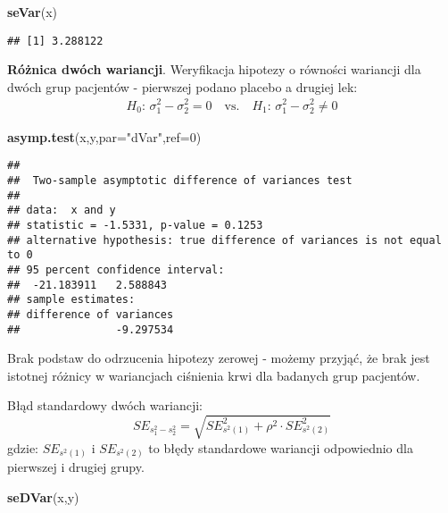 \documentclass[polish,]{book}
\newenvironment{Shaded}{\begin{snugshade}}{\end{snugshade}}
\newcommand{\DataTypeTok}[1]{\textcolor[rgb]{0.13,0.29,0.53}{#1}}
\newcommand{\DecValTok}[1]{\textcolor[rgb]{0.00,0.00,0.81}{#1}}
\newcommand{\KeywordTok}[1]{\textcolor[rgb]{0.13,0.29,0.53}{\textbf{#1}}}
\newcommand{\NormalTok}[1]{#1}
\newcommand{\StringTok}[1]{\textcolor[rgb]{0.31,0.60,0.02}{#1}}
\begin{document}
\begin{Shaded}
\begin{Highlighting}[]
\KeywordTok{seVar}\NormalTok{(x)}
\end{Highlighting}
\end{Shaded}

\begin{verbatim}
## [1] 3.288122
\end{verbatim}

\textbf{Różnica dwóch wariancji}. Weryfikacja hipotezy o równości wariancji dla dwóch grup pacjentów - pierwszej podano placebo a drugiej lek:
\[
\begin{array}{ll}
H_0:\,\sigma^2_1-\sigma^2_2 = 0\quad\mbox{vs.}\quad H_1:\,\sigma^2_1-\sigma^2_2 \neq 0
\end{array}
\]

\begin{Shaded}
\begin{Highlighting}[]
\KeywordTok{asymp.test}\NormalTok{(x,y,}\DataTypeTok{par=}\StringTok{"dVar"}\NormalTok{,}\DataTypeTok{ref=}\DecValTok{0}\NormalTok{)}
\end{Highlighting}
\end{Shaded}

\begin{verbatim}
## 
##  Two-sample asymptotic difference of variances test
## 
## data:  x and y
## statistic = -1.5331, p-value = 0.1253
## alternative hypothesis: true difference of variances is not equal to 0
## 95 percent confidence interval:
##  -21.183911   2.588843
## sample estimates:
## difference of variances 
##               -9.297534
\end{verbatim}

Brak podstaw do odrzucenia hipotezy zerowej - możemy przyjąć, że brak jest istotnej różnicy w wariancjach ciśnienia krwi dla badanych grup pacjentów.

Błąd standardowy dwóch wariancji:
\begin{equation}
SE_{s_1^2-s_2^2}=\sqrt{SE_{s^2(1)}^2 +\rho^2\cdot SE_{s^2(2)}^2}
\label{eq:wz1148}
\end{equation}
gdzie: \(SE_{s^2(1)}\) i \(SE_{s^2(2)}\) to błędy standardowe wariancji odpowiednio dla pierwszej i drugiej grupy.

\begin{Shaded}
\begin{Highlighting}[]
\KeywordTok{seDVar}\NormalTok{(x,y)}
\end{Highlighting}
\end{Shaded}
\end{document}
